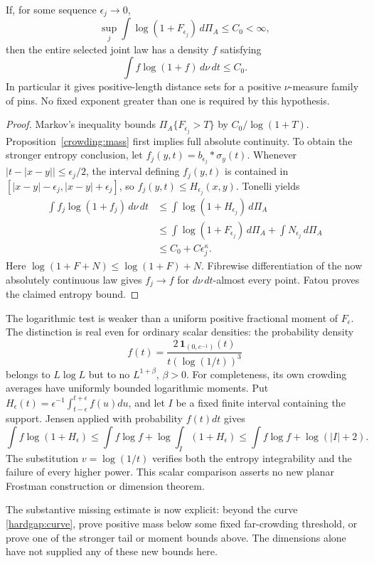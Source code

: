 \begin{proposition}\label{crowding:entropy}
If, for some sequence \(\epsilon_j\to0\),
\begin{equation}\label{crowding:loghyp}
 \sup_j\int\log(1+F_{\epsilon_j})\,d\Pi_A\le C_0<\infty,
\end{equation}
then the entire selected joint law has a density \(f\) satisfying
\[
 \int f\log(1+f)\,d\nu\,dt\le C_0.
\]
In particular it gives positive-length distance sets for a positive
\(\nu\)-measure family of pins. No fixed exponent greater than one
is required by this hypothesis.
\end{proposition}

\begin{proof}
Markov's inequality bounds
\(\Pi_A\{F_{\epsilon_j}>T\}\) by \(C_0/\log(1+T)\).
Proposition~\ref{crowding:mass} first implies full absolute continuity.
To obtain the stronger entropy conclusion, let
\(f_j(y,t)=b_{\epsilon_j}*\sigma_y(t)\).
Whenever \(|t-|x-y||\le\epsilon_j/2\), the interval defining
\(f_j(y,t)\) is contained in
\([|x-y|-\epsilon_j,|x-y|+\epsilon_j]\), so
\(f_j(y,t)\le H_{\epsilon_j}(x,y)\).
Tonelli yields
\begin{align*}
 \int f_j\log(1+f_j)\,d\nu\,dt
 &\le\int\log(1+H_{\epsilon_j})\,d\Pi_A\\
 &\le\int\log(1+F_{\epsilon_j})\,d\Pi_A
       +\int N_{\epsilon_j}\,d\Pi_A\\
 &\le C_0+C\epsilon_j^\kappa.
\end{align*}
Here \(\log(1+F+N)\le\log(1+F)+N\).
Fibrewise differentiation of the now absolutely continuous law gives
\(f_j\to f\) for \(d\nu\,dt\)-almost every point.
Fatou proves the claimed entropy bound.
\end{proof}

The logarithmic test is weaker than a uniform positive fractional moment
of \(F_\epsilon\). The distinction is real even for ordinary scalar
densities: the probability density
\[
 f(t)=\frac{2\,\mathbf1_{(0,e^{-1})}(t)}
              {t(\log(1/t))^3}
\]
belongs to \(L\log L\) but to no \(L^{1+\beta}\), \(\beta>0\).
For completeness, its own crowding averages have uniformly bounded
logarithmic moments. Put
\(H_\epsilon(t)=\epsilon^{-1}\int_{t-\epsilon}^{t+\epsilon}f(u)du\),
and let \(I\) be a fixed finite interval containing the support.
Jensen applied with probability \(f(t)dt\) gives
\[
 \int f\log(1+H_\epsilon)
 \le\int f\log f+\log\!\int_I(1+H_\epsilon)
 \le\int f\log f+\log(|I|+2).
\]
The substitution \(v=\log(1/t)\) verifies both the entropy integrability
and the failure of every higher power. This scalar comparison asserts no
new planar Frostman construction or dimension theorem.

The substantive missing estimate is now explicit: beyond the curve
\eqref{hardgap:curve}, prove positive mass below some fixed far-crowding
threshold, or prove one of the stronger tail or moment bounds above.
The dimensions alone have not supplied any of these new bounds here.
